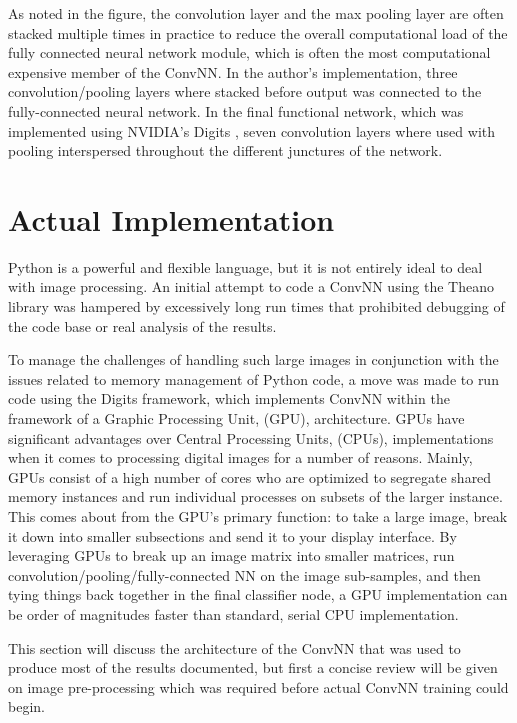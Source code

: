 \documentclass[letterpaper,12pt]{article}
\begin{document}
As noted in the figure, the convolution layer and the max pooling layer are often stacked multiple times in practice to reduce the overall computational load of the fully connected neural network module, which is often the most computational expensive member of the ConvNN. In the author's implementation, three convolution/pooling layers where stacked before output was connected to the fully-connected neural network. In the final functional network, which was implemented using NVIDIA's Digits \cite{digits}, seven convolution layers where used with pooling interspersed throughout the different junctures of the network.

\section{Actual Implementation}

Python is a powerful and flexible language, but it is not entirely ideal to deal with image processing. An initial attempt to code a ConvNN using the Theano library \cite{theano} was hampered by excessively long run times that prohibited debugging of the code base or real analysis of the results.

To manage the challenges of handling such large images in conjunction with the issues related to memory management of Python code, a move was made to run code using the Digits framework, which implements ConvNN within the framework of a Graphic Processing Unit, (GPU), architecture. GPUs have significant advantages over Central Processing Units, (CPUs), implementations when it comes to processing digital images for a number of reasons. Mainly, GPUs consist of a high number of cores who are optimized to segregate shared memory instances and run individual processes on subsets of the larger instance. This comes about from the GPU's  primary function: to take a large image, break it down into smaller subsections and send it to your display interface. By leveraging GPUs to break up an image matrix into smaller matrices, run convolution/pooling/fully-connected NN on the image sub-samples, and then tying things back together in the final classifier node, a GPU implementation can be order of magnitudes faster than standard, serial CPU implementation.

This section will discuss the architecture of the ConvNN that was used to produce most of the results documented, but first a concise review will be given on image pre-processing which was required before actual ConvNN training could begin.
\end{document}
